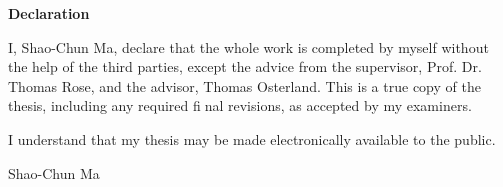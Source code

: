 \thispagestyle{plain}
\vspace*{\fill}
    \begin{center}
        \Large
        \textbf{Declaration}
    \end{center}

    \vspace{1cm}

    I, Shao-Chun Ma, declare that the whole work is completed by myself without the help of the third parties, except the advice from the supervisor, Prof. Dr. Thomas Rose, and the advisor, Thomas Osterland. This is a true copy of the thesis, including any required final revisions, as accepted by my examiners.

    I understand that my thesis may be made electronically available to the public.

     Shao-Chun Ma
\vspace*{\fill}
